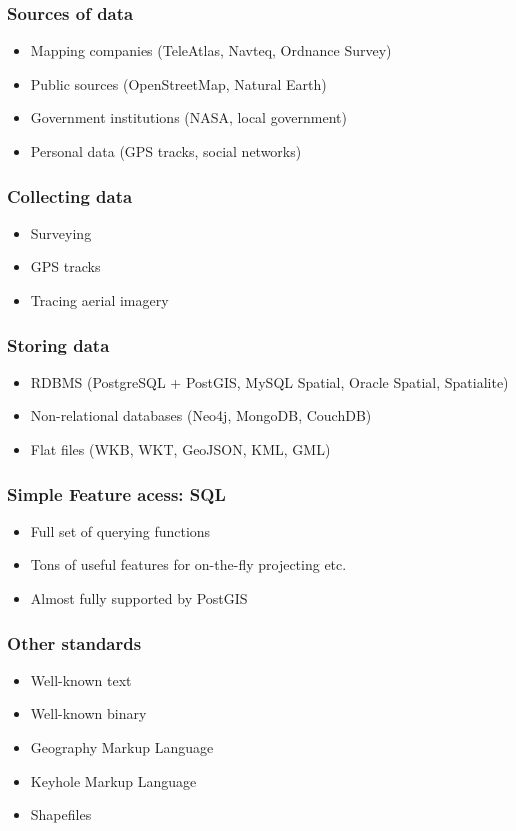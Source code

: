\documentclass{beamer}
\begin{document}
\begin{frame}
  \frametitle{Sources of data}
  \begin{itemize}
  \item Mapping companies (TeleAtlas, Navteq, Ordnance Survey)
  \item Public sources (OpenStreetMap, Natural Earth)
  \item Government institutions (NASA, local government)
  \item Personal data (GPS tracks, social networks)
  \end{itemize}
\end{frame}

\begin{frame}
  \frametitle{Collecting data}
  \begin{itemize}
  \item Surveying
  \item GPS tracks
  \item Tracing aerial imagery
  \end{itemize}
\end{frame}

\begin{frame}
  \frametitle{Storing data}
  \begin{itemize}
  \item RDBMS (PostgreSQL + PostGIS, MySQL Spatial, Oracle Spatial, Spatialite)
  \item Non-relational databases (Neo4j, MongoDB, CouchDB)
  \item Flat files (WKB, WKT, GeoJSON, KML, GML)
  \end{itemize}
\end{frame}

\begin{frame}
  \frametitle{Simple Feature acess: SQL}
  \begin{itemize}
  \item Full set of querying functions
  \item Tons of useful features for on-the-fly projecting etc.
  \item Almost fully supported by PostGIS
  \end{itemize}
\end{frame}

\begin{frame}
  \frametitle{Other standards}
  \begin{itemize}
  \item Well-known text
  \item Well-known binary
  \item Geography Markup Language
  \item Keyhole Markup Language
  \item Shapefiles
  \end{itemize}
\end{frame}
\end{document}

